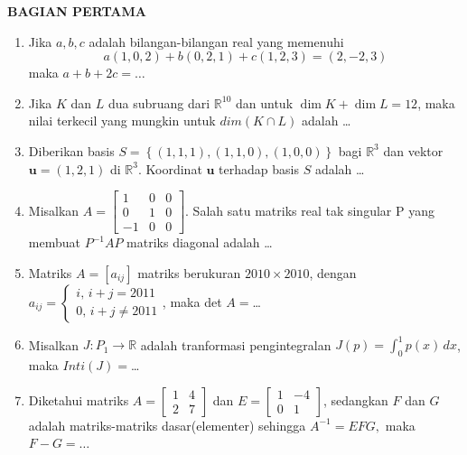 \documentclass[12pt,twoside]{article}
\begin{document}
\textbf{BAGIAN PERTAMA}
\begin{enumerate}
	\item Jika $a,b,c$ adalah bilangan-bilangan real yang memenuhi
	      \begin{equation*}
		      a(1,0,2) + b(0,2,1) + c(1,2,3) = (2,-2,3)
	      \end{equation*}
	      maka $a+b+2c = \dots$

	\item Jika $K$ dan $L$ dua subruang dari $\mathbb{R}^{10}$ dan untuk $\dim K + \dim L = 12$, maka nilai terkecil yang mungkin untuk $dim(K \cap L)$ adalah \dots

	\item Diberikan basis $S = \left\lbrace (1,1,1),(1,1,0),(1,0,0) \right\rbrace$ bagi $\mathbb{R}^3$ dan vektor $\textbf{u} = (1,2,1) $ di $\mathbb{R}^3$. Koordinat $\textbf{u}$ terhadap basis $S$ adalah \dots

	\item Misalkan $A = \left[\begin{array}{ccc}
				      1 & 0 & 0 \\0&1&0\\-1&0&0
			      \end{array}\right]$.  Salah satu matriks real tak singular P yang membuat $P^{-1}AP$ matriks diagonal adalah \dots

	\item Matriks $A = [a_{ij}]$ matriks berukuran $2010 \times 2010$, dengan $ a_{ij} = \begin{cases} i,  \, i+j = 2011 \\0,  \, i+j \neq 2011
		      \end{cases}$, maka det $A = $\dots

	\item Misalkan $J : P_1 \to \mathbb{R}$ adalah tranformasi pengintegralan $J(p) = \displaystyle\int_{0}^{1} p(x)\,dx$, maka $Inti(J) = $\dots

	\item Diketahui matriks  $A = \left[\begin{array}{cc}
				      1 & 4 \\2&7
			      \end{array}\right]$ dan  $E = \left[\begin{array}{cc}
				      1 & -4 \\0&1
			      \end{array}\right]$, sedangkan $F$ dan $G$ adalah matriks-matriks dasar(elementer) sehingga $A^{-1} = EFG,$ maka $F-G = \dots$


\end{enumerate}
\end{document}
